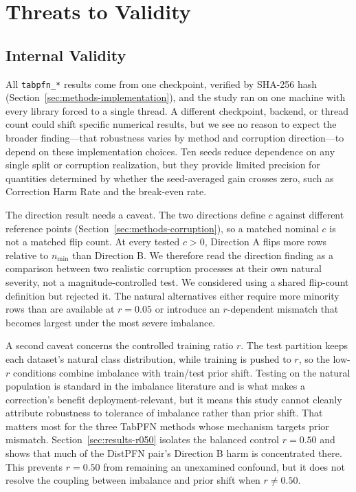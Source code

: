 \section{Threats to Validity}
\label{sec:threats}

\subsection{Internal Validity}
\label{sec:threats-internal}

All \texttt{tabpfn\_*} results come from one checkpoint, verified by SHA-256
hash (Section~\ref{sec:methods-implementation}), and the study ran on one
machine with every library forced to a single thread. A different checkpoint,
backend, or thread count could shift specific numerical results, but we see no
reason to expect the broader finding---that robustness varies by method and
corruption direction---to depend on these implementation choices. Ten seeds
reduce dependence on any single split or corruption realization, but they
provide limited precision for quantities determined by whether the seed-averaged
gain crosses zero, such as Correction Harm Rate and the break-even rate.

The direction result needs a caveat. The two directions define $c$ against
different reference points (Section~\ref{sec:methods-corruption}), so a matched
nominal $c$ is not a matched flip count. At every tested $c>0$, Direction A
flips more rows relative to $n_{\min}$ than Direction B. We therefore read the
direction finding as a comparison between two realistic corruption processes at
their own natural severity, not a magnitude-controlled test. We considered using
a shared flip-count definition but rejected it. The natural alternatives either
require more minority rows than are available at $r{=}0.05$ or introduce an
$r$-dependent mismatch that becomes largest under the most severe imbalance.

A second caveat concerns the controlled training ratio $r$. The test partition
keeps each dataset's natural class distribution, while training is pushed to
$r$, so the low-$r$ conditions combine imbalance with train/test prior shift.
Testing on the natural population is standard in the imbalance literature and
is what makes a correction's benefit deployment-relevant, but it means this
study cannot cleanly attribute robustness to tolerance of imbalance rather than
prior shift. That matters most for the three TabPFN methods whose mechanism
targets prior mismatch. Section~\ref{sec:results-r050} isolates the balanced
control $r{=}0.50$ and shows that much of the DistPFN pair's Direction B harm is
concentrated there. This prevents $r{=}0.50$ from remaining an unexamined
confound, but it does not resolve the coupling between imbalance and prior shift
when $r{\neq}0.50$.

